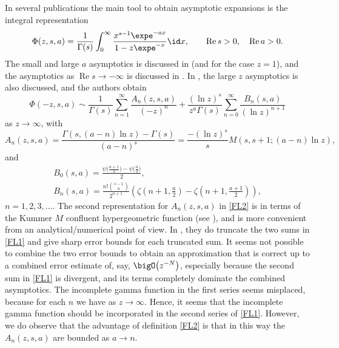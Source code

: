 In several publications the main tool to obtain asymptotic expansions is the integral
representation
\begin{equation}\label{int}
 \Phi(z,s,a)=\frac1{\Gamma(s)}\int_0^\infty
 \frac{x^{s-1}\expe^{-ax}}{1-z\expe^{-x}}\id x,\qquad \operatorname{Re} s>0,\quad\operatorname{Re} a>0.
\end{equation}
The small and large $a$ asymptotics is discussed in \cite{Cai2019,Ferreira2004,paris2016stokes} (and \cite{Nemes2017} for the case $z=1$), and
the asymptotics as $\operatorname{Re} s\to -\infty$ is discussed in \cite{Navas2013}.
In \cite{Ferreira2004}, the large $z$ asymptotics is also discussed, and the authors obtain
\begin{equation}\label{FL1}
 \Phi(-z,s,a)\sim\frac1{\Gamma(s)}\sum_{n=1}^\infty
 \frac{A_n(z,s,a)}{(-z)^{n}}+\frac{(\ln z)^s}{z^a\Gamma(s)}
 \sum_{n=0}^\infty\frac{B_n(s,a)}{(\ln z)^{n+1}}
\end{equation}
as $z\to\infty$, with
\begin{equation}\label{FL2}
 A_n(z,s,a)=\frac{\Gamma(s,(a-n)\ln z)-\Gamma(s)}{(a-n)^s}
 =\frac{-(\ln z)^s}{s}M(s,s+1;(a-n)\ln z),
\end{equation}
and
\begin{gather*}%
 B_0(s,a)=\frac{\psi\bigl(\frac{a+1}2\bigr)-
 \psi\bigl(\frac{a}2\bigr)}2,\\
 B_n(s,a)=\frac{n!{s-1\choose n}}{2^{n+1}}\left( \zeta\left(n+1,\frac{a}2\right)-
 \zeta\left(n+1,\frac{a+1}2\right)\right),
\end{gather*}
$n=1,2,3,\ldots$. The second representation for $A_n(z,s,a)$ in \eqref{FL2} is in terms
of the Kummer $M$ confluent hypergeometric function
(see \cite[\href{https://dlmf.nist.gov/13.2.E2}{equation~(13.2.2)}]{NIST:DLMF}),
and is more convenient from an analytical/numerical point of view.
In \cite{Ferreira2004}, they do truncate the two sums in \eqref{FL1} and give sharp error bounds
for each truncated sum. It seems not possible to combine the two error bounds
to obtain an approximation
that is correct up to a combined error estimate of, say, $\bigO\bigl(z^{-N}\bigr)$,
especially because the second sum in \eqref{FL1} is divergent, and its terms completely
dominate the combined asymptotics. The incomplete gamma function in the first series seems
misplaced, because for each $n$ we have
 as $z\to\infty$.
Hence, it seems that the incomplete gamma function should be incorporated in the second
series of \eqref{FL1}. However, we do observe that the advantage of definition
\eqref{FL2} is that in this way the $A_n(z,s,a)$ are bounded as $a\to n$.

